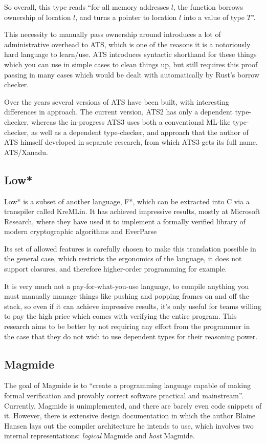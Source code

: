 \documentclass[12pt,twoside]{report}
\begin{document}
So overall, this type reads ``for all memory addresses $l$, the function borrows ownership of location $l$, and turns a pointer to location $l$ into a value of type $T$''.

This necessity to manually pass ownership around introduces a lot of administrative overhead to ATS, which is one of the reasons it is a notoriously hard language to learn/use. ATS introduces syntactic shorthand for these things which you can use in simple cases to clean things up, but still requires this proof passing in many cases which would be dealt with automatically by Rust's borrow checker.

Over the years several versions of ATS have been built, with interesting differences in approach. The current version, ATS2 has only a dependent type-checker, whereas the in-progress ATS3 uses both a conventional ML-like type-checker, as well as a dependent type-checker, and approach that the author of ATS himself developed in separate research, from which ATS3 gets its full name, ATS/Xanadu.

\subsection{Low*}
Low*\citep{protzenko_low_2017} is a subset of another language, F*, which can be extracted into C via a transpiler called KreMLin. It has achieved impressive results, mostly at Microsoft Research, where they have used it to implement a formally verified library of modern cryptographic algorithms\citep{star_2024} and EverParse

Its set of allowed features is carefully chosen to make this translation possible in the general case, which restricts the ergonomics of the language, it does not support closures, and therefore higher-order programming for example.

It is very much not a pay-for-what-you-use language, to compile anything you must manually manage things like pushing and popping frames on and off the stack, so even if it can achieve impressive results, it's only useful for teams willing to pay the high price which comes with verifying the entire program. This research aims to be better by not requiring any effort from the programmer in the case that they do not wish to use dependent types for their reasoning power.

\subsection{Magmide}
The goal of Magmide \citep{MagmideMagmide2024} is to ``create a programming language capable of making formal verification and provably correct software practical and mainstream''. Currently, Magmide is unimplemented, and there are barely even code snippets of it. However, there is extensive design documentation in which the author Blaine Hansen lays out the compiler architecture he intends to use, which involves two internal representations: \textit{logical} Magmide and \textit{host} Magmide.
\end{document}
